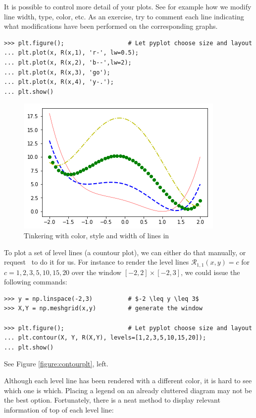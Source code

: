 It is possible to control more detail of your plots.  See for example how we modify line width, type, color, etc.  As an exercise, try to comment each line indicating what modifications have been performed on the corresponding graphs.

\begin{verbatim}
>>> plt.figure();                  # Let pyplot choose size and layout
... plt.plot(x, R(x,1), 'r-', lw=0.5);
... plt.plot(x, R(x,2), 'b--',lw=2);
... plt.plot(x, R(x,3), 'go');
... plt.plot(x, R(x,4), 'y-.');
... plt.show()
\end{verbatim}

\begin{figure}[ht!]
\includegraphics[width=0.75\linewidth]{images/intermediateplt.png}
\caption{Tinkering with color, style and width of lines in \pyplot}
\label{figure:intermediateplt}
\end{figure}

To plot a set of level lines (a countour plot), we can either do that manually, or request \pyplot\ to do it for us.  For instance to render the level lines $\mathcal{R}_{1,1}(x,y)=c$ for $c=1,2,3,5,10,15,20$ over the window $[-2,2] \times [-2,3]$, we could issue the following commands:

\begin{verbatim}
>>> y = np.linspace(-2,3)          # $-2 \leq y \leq 3$
>>> X,Y = np.meshgrid(x,y)         # generate the window

>>> plt.figure();                  # Let pyplot choose size and layout
... plt.contour(X, Y, R(X,Y), levels=[1,2,3,5,10,15,20]);
... plt.show()
\end{verbatim}

See Figure \ref{figure:contourplt}, left.

Although each level line has been rendered with a different color, it is hard to see which one is which.  Placing a legend on an already cluttered diagram may not be the best option.  Fortunately, there is a neat method to display relevant information of top of each level line:

